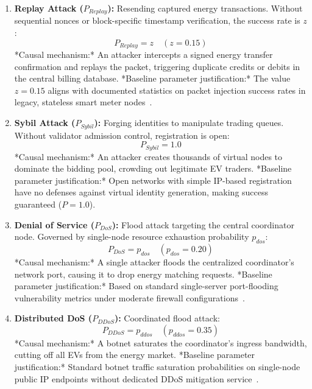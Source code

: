 \documentclass[10pt,twocolumn,journal]{IEEEtran}
\begin{document}
\begin{enumerate}[leftmargin=*]
    \item \textbf{Replay Attack ($P_{Replay}$):} Resending captured energy transactions. Without sequential nonces or block-specific timestamp verification, the success rate is $z$:
    \begin{equation}
    P_{Replay} = z \quad (z = 0.15)
    \end{equation}
    *Causal mechanism:* An attacker intercepts a signed energy transfer confirmation and replays the packet, triggering duplicate credits or debits in the central billing database.
    *Baseline parameter justification:* The value $z = 0.15$ aligns with documented statistics on packet injection success rates in legacy, stateless smart meter nodes~\cite{yan2012}.

    \item \textbf{Sybil Attack ($P_{Sybil}$):} Forging identities to manipulate trading queues. Without validator admission control, registration is open:
    \begin{equation}
    P_{Sybil} = 1.0
    \end{equation}
    *Causal mechanism:* An attacker creates thousands of virtual nodes to dominate the bidding pool, crowding out legitimate EV traders.
    *Baseline parameter justification:* Open networks with simple IP-based registration have no defenses against virtual identity generation, making success guaranteed ($P=1.0$).

    \item \textbf{Denial of Service ($P_{DoS}$):} Flood attack targeting the central coordinator node. Governed by single-node resource exhaustion probability $p_{dos}$:
    \begin{equation}
    P_{DoS} = p_{dos} \quad (p_{dos} = 0.20)
    \end{equation}
    *Causal mechanism:* A single attacker floods the centralized coordinator's network port, causing it to drop energy matching requests.
    *Baseline parameter justification:* Based on standard single-server port-flooding vulnerability metrics under moderate firewall configurations~\cite{wang2013}.

    \item \textbf{Distributed DoS ($P_{DDoS}$):} Coordinated flood attack:
    \begin{equation}
    P_{DDoS} = p_{ddos} \quad (p_{ddos} = 0.35)
    \end{equation}
    *Causal mechanism:* A botnet saturates the coordinator's ingress bandwidth, cutting off all EVs from the energy market.
    *Baseline parameter justification:* Standard botnet traffic saturation probabilities on single-node public IP endpoints without dedicated DDoS mitigation service~\cite{wang2013}.


\end{enumerate}
\end{document}

